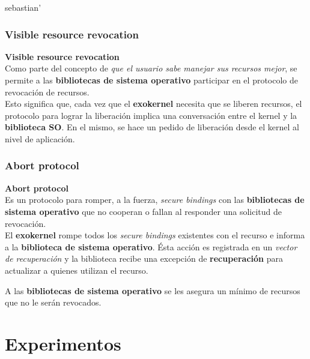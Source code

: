 sebastian'\]\documentclass[10pt]{beamer}
\begin{document}
\subsubsection{Visible resource revocation}

\begin{frame}
\textbf{Visible resource revocation} \\[2em]

Como parte del concepto de \emph{que el usuario sabe manejar sus recursos mejor}, se permite a las \textbf{bibliotecas de sistema operativo} participar en el protocolo de revocación de recursos.\\[1em]

Esto significa que, cada vez que el \textbf{exokernel} necesita que se liberen recursos, el protocolo para lograr la liberación implica una conversación entre el kernel y la \textbf{biblioteca SO}. En el mismo, se hace un pedido de liberación desde el kernel al nivel de aplicación.

\end{frame}


\subsubsection{Abort protocol}

\begin{frame}
\textbf{Abort protocol} \\[2em]

Es un protocolo para romper, a la fuerza, \textit{secure bindings} con las \textbf{bibliotecas de sistema operativo} que no cooperan o fallan al responder una solicitud de revocación.\\[1em]

El \textbf{exokernel} rompe todos los \textit{secure bindings} existentes con el recurso e informa a la \textbf{biblioteca de sistema operativo}. Ésta acción es registrada en un \textit{vector de recuperación} y la biblioteca recibe una excepción de \textbf{recuperación} para actualizar a quienes utilizan el recurso.

A las \textbf{bibliotecas de sistema operativo} se les asegura un mínimo de recursos que no le serán revocados. 

\end{frame}


\section{Experimentos}
\end{document}
